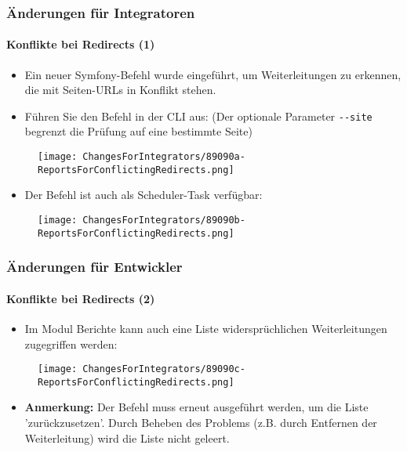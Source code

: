 \begin{frame}[fragile]
	\frametitle{Änderungen für Integratoren}
	\framesubtitle{Konflikte bei Redirects (1)}

	\begin{itemize}
		\item Ein neuer Symfony-Befehl wurde eingeführt, um Weiterleitungen zu erkennen,
			die mit Seiten-URLs in Konflikt stehen.
		\item Führen Sie den Befehl in der CLI aus:\newline
			\smaller
				(Der optionale Parameter \texttt{-}\texttt{-site} begrenzt die Prüfung auf eine bestimmte Seite)
			\normalsize
	\end{itemize}

	\begin{figure}
		\texttt{[image: ChangesForIntegrators/89090a-ReportsForConflictingRedirects.png]}
	\end{figure}

	\begin{itemize}
		\item Der Befehl ist auch als Scheduler-Task verfügbar:
	\end{itemize}

	\begin{figure}
		\texttt{[image: ChangesForIntegrators/89090b-ReportsForConflictingRedirects.png]}
	\end{figure}

\end{frame}


\begin{frame}[fragile]
	\frametitle{Änderungen für Entwickler}
	\framesubtitle{Konflikte bei Redirects (2)}

	\begin{itemize}
		\item Im Modul Berichte kann auch eine Liste widersprüchlichen Weiterleitungen zugegriffen werden:
	\end{itemize}

	\begin{figure}
		\texttt{[image: ChangesForIntegrators/89090c-ReportsForConflictingRedirects.png]}
	\end{figure}

	\begin{itemize}
		\item
			\small\textbf{Anmerkung:}
				Der Befehl muss erneut ausgeführt werden, um die Liste 'zurückzusetzen'.
				Durch Beheben des Problems (z.B. durch Entfernen der Weiterleitung) wird die Liste nicht geleert.
			\normalsize
	\end{itemize}

\end{frame}


